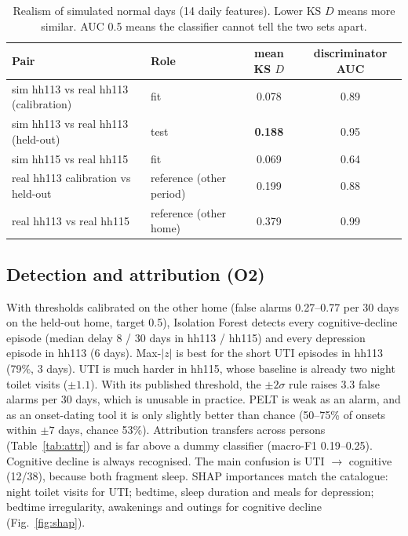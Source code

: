 \documentclass[10pt,a4paper]{article}
\begin{document}
\begin{table}[h]
\centering\small
\begin{tabular}{llcc}
\toprule
Pair & Role & mean KS $D$ & discriminator AUC \\
\midrule
sim hh113 vs real hh113 (calibration) & fit & 0.078 & 0.89 \\
sim hh113 vs real hh113 (held-out) & test & \textbf{0.188} & 0.95 \\
sim hh115 vs real hh115 & fit & 0.069 & 0.64 \\
real hh113 calibration vs held-out & reference (other period) & 0.199 & 0.88 \\
real hh113 vs real hh115 & reference (other home) & 0.379 & 0.99 \\
\bottomrule
\end{tabular}
\caption{Realism of simulated normal days (14 daily features). Lower KS $D$ means more similar. AUC 0.5 means the classifier cannot tell the two sets apart.}
\label{tab:realism}
\end{table}

\subsection{Detection and attribution (O2)}
With thresholds calibrated on the other home (false alarms 0.27--0.77 per 30 days on the held-out home, target 0.5),
Isolation Forest detects every cognitive-decline episode (median delay 8 / 30 days in hh113 / hh115) and every depression
episode in hh113 (6 days). Max-$|z|$ is best for the short UTI episodes in hh113 (79\%, 3 days). UTI is much harder in hh115,
whose baseline is already two night toilet visits ($\pm1.1$). With its published threshold, the $\pm2\sigma$ rule raises
3.3 false alarms per 30 days, which is unusable in practice. PELT is weak as an alarm, and as an onset-dating tool it is
only slightly better than chance (50--75\% of onsets within $\pm7$ days, chance 53\%). Attribution transfers across
persons (Table~\ref{tab:attr}) and is far above a dummy classifier (macro-F1 0.19--0.25). Cognitive decline is always
recognised. The main confusion is UTI $\rightarrow$ cognitive (12/38), because both fragment sleep. SHAP importances match
the catalogue: night toilet visits for UTI; bedtime, sleep duration and meals for depression; bedtime irregularity,
awakenings and outings for cognitive decline (Fig.~\ref{fig:shap}).
\end{document}

